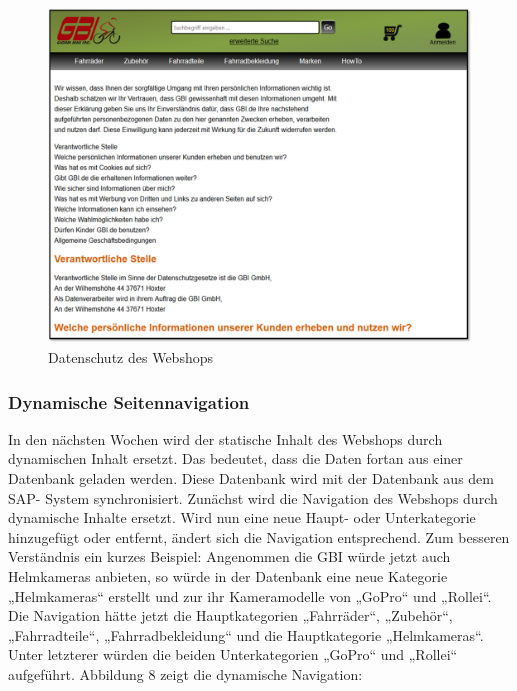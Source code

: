 \begin{figure}[H]
\begin{center}
\includegraphics[width=150mm]{Bilder/Abbildung8-DatenschutzDesWebshops.png}
\end{center}
\caption{Datenschutz des Webshops}
\end{figure}

\subsubsection{Dynamische Seitennavigation}

In den nächsten Wochen wird der statische Inhalt des Webshops durch dynamischen Inhalt ersetzt. Das bedeutet, dass die Daten fortan aus einer Datenbank geladen werden. Diese Datenbank wird mit der Datenbank aus dem SAP- System synchronisiert. Zunächst wird die Navigation des Webshops durch dynamische Inhalte ersetzt. Wird nun eine neue Haupt- oder Unterkategorie hinzugefügt oder entfernt, ändert sich die Navigation entsprechend. Zum besseren Verständnis ein kurzes Beispiel: Angenommen die GBI würde jetzt auch Helmkameras anbieten, so würde in der Datenbank eine neue Kategorie „Helmkameras“ erstellt und zur ihr Kameramodelle von „GoPro“ und „Rollei“. Die Navigation hätte jetzt die Hauptkategorien „Fahrräder“, „Zubehör“, „Fahrradteile“, „Fahrradbekleidung“ und die Hauptkategorie „Helmkameras“. Unter letzterer würden die beiden Unterkategorien „GoPro“ und „Rollei“ aufgeführt. Abbildung 8 zeigt die dynamische Navigation:

